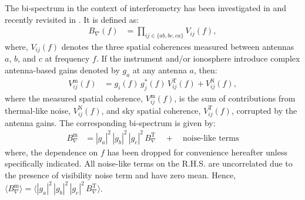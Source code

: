 \documentclass[
reprint,
superscriptaddress,
amsmath,
amssymb,
aps,
prd
]{revtex4-1}
\begin{document}
The bi-spectrum in the context of interferometry has been investigated in \cite{jen58,kul89,tay99,tho01,mon06} and recently revisited in \cite{car18}. It is defined as:
\begin{align}
  B_\nabla(f) &= \prod_{ij\in\{ab,bc,ca\}} V_{ij}(f),
\end{align}
where, $V_{ij}(f)$ denotes the three spatial coherences measured between antennas $a$, $b$, and $c$ at frequency $f$. If the instrument and/or ionosphere introduce complex antenna-based gains denoted by $g_a$ at any antenna $a$, then: 
\begin{align}\label{eqn:vis-antgains}
  V_{ij}^\textrm{m}(f) &= g_i(f)\, g_j^*(f)\, V_{ij}^\textrm{T}(f) + V_{ij}^\textrm{N}(f),
\end{align}
where the measured spatial coherence, $V_{ij}^\textrm{m}(f)$, is the sum of contributions from thermal-like noise, $V_{ij}^\textrm{N}(f)$, and sky spatial coherence, $V_{ij}^\textrm{T}(f)$, corrupted by the antenna gains. The corresponding bi-spectrum is given by:
\begin{align}\label{eqn:bispectrum-terms}
  B_\nabla^\textrm{m} &= |g_a|^2\, |g_b|^2\, |g_c|^2\, B_\nabla^\textrm{T}\quad + \quad \textrm{noise-like terms}
\end{align}
where, the dependence on $f$ has been dropped for convenience hereafter unless specifically indicated.
All noise-like terms on the R.H.S. are uncorrelated due to the presence of visibility noise term and have zero mean.
Hence, $\langle B_\nabla^\textrm{m}\rangle = \langle |g_a|^2\, |g_b|^2\, |g_c|^2\, B_\nabla^\textrm{T}\rangle$.
\end{document}
